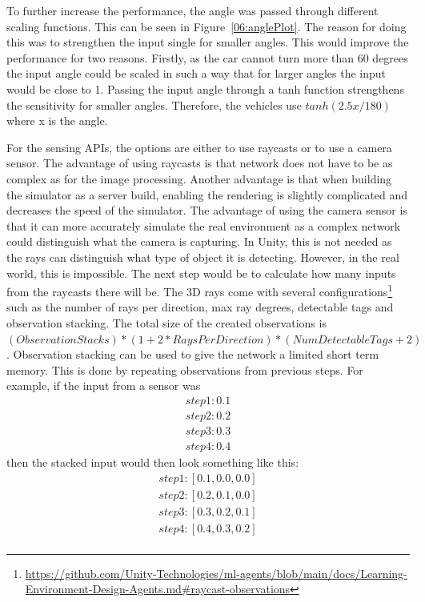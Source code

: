 To further increase the performance, the angle was passed through different scaling functions. This can be seen in Figure~\ref{06:anglePlot}. The reason for doing this was to strengthen the input single for smaller angles. This would improve the performance for two reasons. Firstly, as the car cannot turn more than 60 degrees the input angle could be scaled in such a way that for larger angles the input would be close to 1. Passing the input angle through a tanh function strengthens the sensitivity for smaller angles. Therefore, the vehicles use $tanh(2.5x/180)$ where x is the angle. 

For the sensing APIs, the options are either to use raycasts or to use a camera sensor. The advantage of using raycasts is that network does not have to be as complex as for the image processing. Another advantage is that when building the simulator as a server build, enabling the rendering is slightly complicated and decreases the speed of the simulator. The advantage of using the camera sensor is that it can more accurately simulate the real environment as a complex network could distinguish what the camera is capturing.  In Unity, this is not needed as the rays can distinguish what type of object it is detecting. However, in the real world, this is impossible. The next step would be to calculate how many inputs from the raycasts there will be. The 3D rays come with several configurations\footnote{\url{https://github.com/Unity-Technologies/ml-agents/blob/main/docs/Learning-Environment-Design-Agents.md#raycast-observations}} such as the number of rays per direction, max ray degrees, detectable tags and observation stacking. The total size of the created observations is $(Observation Stacks) * (1 + 2 * Rays Per Direction) * (Num Detectable Tags + 2)$. Observation stacking can be used to give the network a limited short term memory. This is done by repeating observations from previous steps. For example, if the input from a sensor was
\begin{equation}
  \begin{aligned}
   step 1: 0.1\\
step 2: 0.2\\
step 3: 0.3\\
step 4: 0.4
\end{aligned}
\end{equation}
then the stacked input would then look something like this:
\begin{equation}
  \begin{aligned}
step 1: [0.1, 0.0, 0.0]\\
step 2: [0.2, 0.1, 0.0]\\
step 3: [0.3, 0.2, 0.1]\\
step 4: [0.4, 0.3, 0.2]\\
\end{aligned}
\end{equation}

